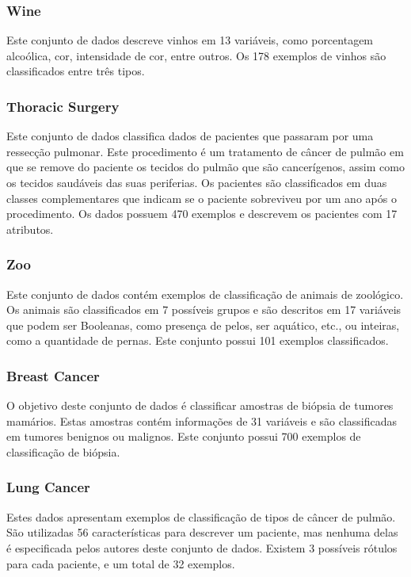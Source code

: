 \subsubsection{Wine}
Este conjunto de dados descreve vinhos em 13 variáveis, como porcentagem 
alcoólica, cor, intensidade de cor, entre outros. Os 178 exemplos de
vinhos são classificados entre três tipos.

\subsubsection{Thoracic Surgery}
Este conjunto de dados classifica dados de pacientes que passaram por
uma ressecção pulmonar. Este procedimento é um tratamento de câncer
de pulmão em que se remove do paciente os tecidos do pulmão que são 
cancerígenos, assim como os tecidos saudáveis das suas periferias.
Os pacientes são classificados em duas classes complementares que 
indicam se o paciente sobreviveu por um ano após o procedimento.
Os dados possuem 470 exemplos e descrevem os pacientes com 17 atributos.

\subsubsection{Zoo}
Este conjunto de dados contém exemplos de classificação de animais de
zoológico. Os animais são classificados em 7 possíveis grupos e são 
descritos em 17 variáveis que podem ser Booleanas, como presença de 
pelos, ser aquático, etc., ou inteiras, como a quantidade de pernas. 
Este conjunto possui 101 exemplos classificados.

\subsubsection{Breast Cancer}
O objetivo deste conjunto de dados é classificar amostras de biópsia
de tumores mamários. Estas amostras contém informações de 31 variáveis
e são classificadas em tumores benignos ou malignos. Este conjunto 
possui 700 exemplos de classificação de biópsia.

\subsubsection{Lung Cancer}
Estes dados apresentam exemplos de classificação de tipos de câncer
de pulmão. São utilizadas 56 características para descrever um paciente,
mas nenhuma delas é especificada pelos autores deste conjunto de dados.
Existem 3 possíveis rótulos para cada paciente, e um total de 32 
exemplos.


